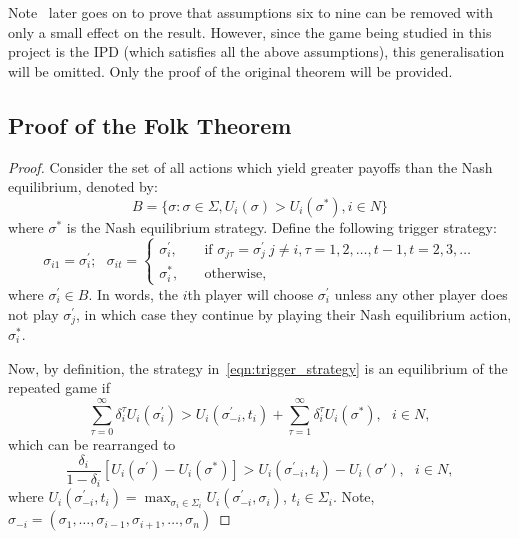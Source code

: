 Note~\cite{friedman1971non} later goes on to prove that assumptions
six to nine can be removed with only a small effect on the result. However,
since the game being studied in this project is the IPD (which satisfies
all the above assumptions), this generalisation will be omitted. Only the
proof of the original theorem will be provided.

\subsection{Proof of the Folk Theorem}

\begin{proof}
    Consider the set of all actions which yield greater payoffs than the Nash
    equilibrium, denoted by:
    \begin{equation}
        B = \{\sigma : \sigma \in \Sigma, U_{i}(\sigma) > U_{i}(\sigma^{*}), i \in N\}
    \end{equation}
    where \(\sigma^{*}\) is the Nash equilibrium strategy. Define the following trigger strategy:
    \begin{equation}
        \sigma_{i1} = \sigma_{i}^{\prime};~~~
        \sigma_{it} = \begin{cases}
            \sigma_{i}^{\prime}, & \quad \text{if } \sigma_{j\tau}=\sigma_{j}^{\prime} \ j \ne i, \tau=1, 2, \ldots, t-1, t=2, 3, \ldots \\
            \sigma_{i}^{*}, & \quad \text{otherwise},
        \end{cases}
    \end{equation}\label{eqn:trigger_strategy}
    where \(\sigma_{i}^{\prime} \in B\). In words, the \(i\)th player will choose \(\sigma_{i}^{\prime}\) unless any
    other player does not play \( \sigma_{j}^{\prime}\), in which case they
    continue by playing their Nash equilibrium action, \(\sigma_{i}^{*}\). 
    
    Now, by definition, the strategy in~\eqref{eqn:trigger_strategy} is an
    equilibrium of the repeated game if 
    \begin{equation}
        \sum_{\tau=0}^{\infty}{\delta_{i}^{\tau}U_{i}(\sigma_{i}^{\prime})} > U_{i}(\sigma_{-i}^{\prime}, t_{i}) + \sum_{\tau=1}^{\infty}{\delta_{i}^{\tau}U_{i}(\sigma^{*})},~~~ i \in N,
    \end{equation}
    which can be rearranged to 
    \begin{equation}
        \frac{\delta_{i}}{1-\delta_{i}}[U_{i}(\sigma^{\prime}) - U_{i}(\sigma^{*})] > U_{i}(\sigma_{-i}^{\prime}, t_{i}) - U_{i}(\sigma{\prime}),~~~ i \in N,
    \end{equation}
    where \(U_{i}(\sigma_{-i}^{\prime}, t_{i}) = \max_{\sigma_{i} \in
    \Sigma_{i}}{U_{i}(\sigma_{-i}^{\prime}, \sigma_{i})}\), \(t_{i} \in
    \Sigma_{i}\). Note, \(\sigma_{-i} = (\sigma_{1}, \ldots, \sigma_{i-1},
    \sigma_{i+1}, \ldots, \sigma_{n})\)


\end{proof}
